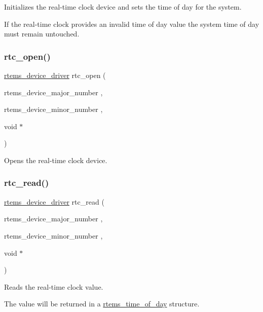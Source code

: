 Initializes the real-\/time clock device and sets the time of day for the system.

If the real-\/time clock provides an invalid time of day value the system time of day must remain untouched. \mbox{\label{group__rtems__rtc_gae84793d63a851c576863c2666b158836}} 
\subsubsection{\texorpdfstring{rtc\_open()}{rtc\_open()}}
{\footnotesize\ttfamily \mbox{\hyperlink{group__ClassicStatus_ga545d41846817eaba6143d52ee4d9e9fe}{rtems\+\_\+device\+\_\+driver}} rtc\+\_\+open (\begin{DoxyParamCaption}\item[{rtems\+\_\+device\+\_\+major\+\_\+number}]{,  }\item[{rtems\+\_\+device\+\_\+minor\+\_\+number}]{,  }\item[{void $\ast$}]{ }\end{DoxyParamCaption})}

Opens the real-\/time clock device. \mbox{\label{group__rtems__rtc_ga7228612815843b7f28591a82a5812f2e}} 
\subsubsection{\texorpdfstring{rtc\_read()}{rtc\_read()}}
{\footnotesize\ttfamily \mbox{\hyperlink{group__ClassicStatus_ga545d41846817eaba6143d52ee4d9e9fe}{rtems\+\_\+device\+\_\+driver}} rtc\+\_\+read (\begin{DoxyParamCaption}\item[{rtems\+\_\+device\+\_\+major\+\_\+number}]{,  }\item[{rtems\+\_\+device\+\_\+minor\+\_\+number}]{,  }\item[{void $\ast$}]{ }\end{DoxyParamCaption})}

Reads the real-\/time clock value.

The value will be returned in a \mbox{\hyperlink{structrtems__time__of__day}{rtems\+\_\+time\+\_\+of\+\_\+day}} structure. \mbox{\label{group__rtems__rtc_ga24c0df997c95c6aa01cac46dd6fe4913}} 
